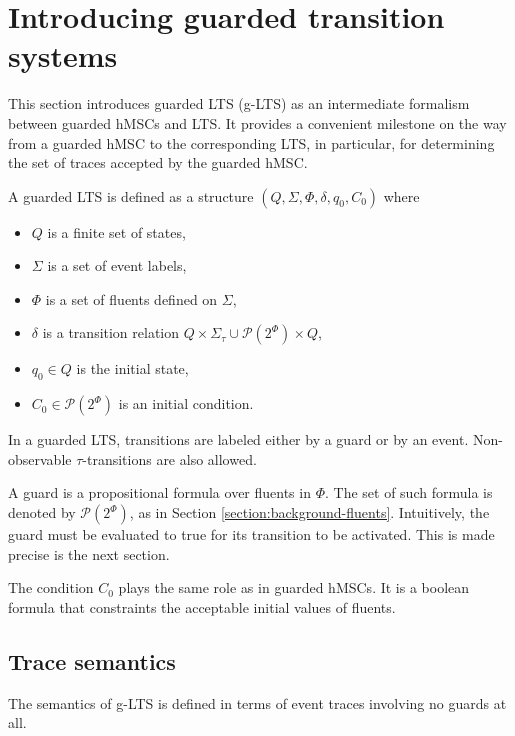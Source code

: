 \section{Introducing guarded transition systems\label{section:deductive-glts}}

This section introduces guarded LTS (g-LTS) as an intermediate formalism between guarded hMSCs and LTS. It provides a convenient milestone on the way from a guarded hMSC to the corresponding LTS, in particular, for determining the set of traces accepted by the guarded hMSC. 

\begin{definition}
\noindent A guarded LTS is defined as a structure $(Q,\Sigma,\Phi,\delta,q_{0},C_{0})$ where 
\begin{itemize}
\item $Q$ is a finite set of states,
\item $\Sigma$ is a set of event labels, 
\item $\Phi$ is a set of fluents defined on $\Sigma$,
\item $\delta$ is a transition relation $Q \times \Sigma_{\tau}\cup\mathcal{P}(2^\Phi) \times Q$,
\item $q_{0} \in Q$ is the initial state,
\item $C_{0} \in \mathcal{P}(2^\Phi)$ is an initial condition. 
\end{itemize}
\end{definition}

In a guarded LTS, transitions are labeled either by a guard or by an event. Non-observable $\tau$-transitions are also allowed. 

A guard is a propositional formula over fluents in $\Phi$. The set of such formula is denoted by $\mathcal{P}(2^\Phi)$, as in Section \ref{section:background-fluents}. Intuitively, the guard must be evaluated to true for its transition to be activated. This is made precise is the next section.

The condition $C_0$ plays the same role as in guarded hMSCs. It is a boolean formula that constraints the acceptable initial values of fluents. 

\subsection{Trace semantics\label{subsection:glts-trace-semantics}} 

The semantics of g-LTS is defined in terms of event traces involving no guards at all.

